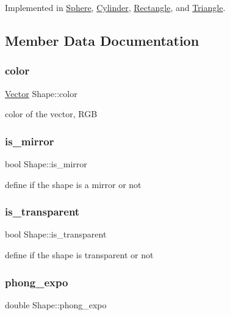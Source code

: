 Implemented in \hyperlink{classSphere_acbd56a4021638361d354e21d68f98e62}{Sphere}, \hyperlink{classCylinder_a0f3c6cca45e3efa5250dc45ebcff81e5}{Cylinder}, \hyperlink{classRectangle_a423b89ddb4be31c3ff22a86dcf076b08}{Rectangle}, and \hyperlink{classTriangle_a3290db0f1a807905ff0293b209e32dbf}{Triangle}.



\subsection{Member Data Documentation}
\mbox{\label{classShape_adb97857c268315aed7861e5204c2485b}} 
\subsubsection{\texorpdfstring{color}{color}}
{\footnotesize\ttfamily \hyperlink{classVector}{Vector} Shape\+::color}

color of the vector, R\+GB \mbox{\label{classShape_a0ead7657fa5e4c7862fe1cedd670a9e5}} 
\subsubsection{\texorpdfstring{is\+\_\+mirror}{is\_mirror}}
{\footnotesize\ttfamily bool Shape\+::is\+\_\+mirror}

define if the shape is a mirror or not \mbox{\label{classShape_ab8da3fc4606e66dea941ec23d25f53ef}} 
\subsubsection{\texorpdfstring{is\+\_\+transparent}{is\_transparent}}
{\footnotesize\ttfamily bool Shape\+::is\+\_\+transparent}

define if the shape is transparent or not \mbox{\label{classShape_a2556fca106f9503e6dfb4da703c28f7f}} 
\subsubsection{\texorpdfstring{phong\+\_\+expo}{phong\_expo}}
{\footnotesize\ttfamily double Shape\+::phong\+\_\+expo}


